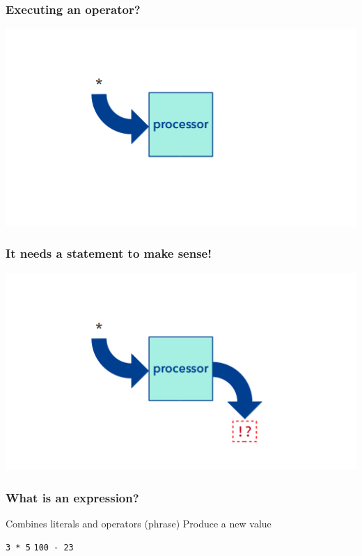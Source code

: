 \documentclass[11pt]{beamer}
\begin{document}
\begin{frame}
  \frametitle{Executing an operator?}
  \includegraphics[width=\textwidth]{./img/computer-operator-0.png}
\end{frame}

\begin{frame}
  \frametitle{It needs a statement to make sense!}
  \includegraphics[width=\textwidth]{./img/computer-operator-1.png}
\end{frame}

\begin{frame}
  \frametitle{What is an \textbf{expression}?}
  \Enlarge

  \begin{itemize}
  \myitem  Combines literals and operators (phrase)
  \myitem  Produce a new value
    \begin{itemize}
    \mysubitem  \texttt{3 * 5}
    \mysubitem  \texttt{100 - 23}
    \end{itemize}
  \end{itemize}
\end{frame}
\end{document}
